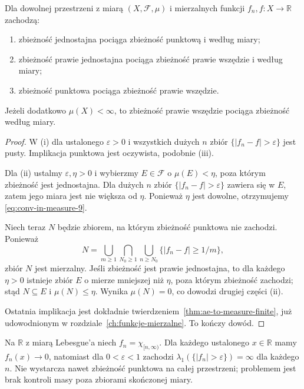 \begin{twierdzenie}
\label{thm:conv-implications-9}
Dla dowolnej przestrzeni z miarą $(X,\mathcal F,\mu)$
i mierzalnych funkcji $f_n,f:X\to\mathbb R$ zachodzą:
\begin{enumerate}[label=\textup{(\roman*)}]
\item zbieżność jednostajna pociąga zbieżność punktową
i według miary;
\item zbieżność prawie jednostajna pociąga zbieżność
prawie wszędzie i według miary;
\item zbieżność punktowa pociąga zbieżność prawie wszędzie.
\end{enumerate}
Jeżeli dodatkowo $\mu(X)<\infty$, to zbieżność prawie
wszędzie pociąga zbieżność według miary.
\end{twierdzenie}
\begin{proof}
W (i) dla ustalonego $\varepsilon>0$ i wszystkich dużych
$n$ zbiór $\{|f_n-f|>\varepsilon\}$ jest pusty.
Implikacja punktowa jest oczywista, podobnie (iii).

Dla (ii) ustalmy $\varepsilon,\eta>0$ i wybierzmy
$E\in\mathcal F$ o $\mu(E)<\eta$, poza którym zbieżność
jest jednostajna. Dla dużych $n$ zbiór
$\{|f_n-f|>\varepsilon\}$ zawiera się w $E$,
zatem jego miara jest nie większa od $\eta$.
Ponieważ $\eta$ jest dowolne, otrzymujemy
\eqref{eq:conv-in-measure-9}.

Niech teraz $N$ będzie zbiorem, na którym zbieżność
punktowa nie zachodzi. Ponieważ
\[
N=\bigcup_{m\ge1}\bigcap_{N_0\ge1}
\bigcup_{n\ge N_0}\{|f_n-f|\ge 1/m\},
\]
zbiór $N$ jest mierzalny. Jeśli zbieżność jest prawie
jednostajna, to dla każdego $\eta>0$ istnieje zbiór
$E$ o mierze mniejszej niż $\eta$, poza którym zbieżność
zachodzi; stąd $N\subseteq E$ i $\mu(N)\le\eta$.
Wynika $\mu(N)=0$, co dowodzi drugiej części (ii).

Ostatnia implikacja jest dokładnie twierdzeniem~\ref{thm:ae-to-measure-finite}, już udowodnionym w rozdziale~\ref{ch:funkcje-mierzalne}. To kończy dowód.
\end{proof}

\begin{przyklad}
\label{ex:ae-not-measure-infinite-9}
Na $\mathbb R$ z miarą Lebesgue'a niech
$f_n=\chi_{[n,\infty)}$. Dla każdego ustalonego
$x\in\mathbb R$ mamy $f_n(x)\to0$, natomiast
dla $0<\varepsilon<1$ zachodzi
$\lambda_1(\{|f_n|>\varepsilon\})=\infty$ dla
każdego $n$. Nie wystarcza nawet zbieżność punktowa
na całej przestrzeni; problemem jest brak kontroli
masy poza zbiorami skończonej miary.
\end{przyklad}

